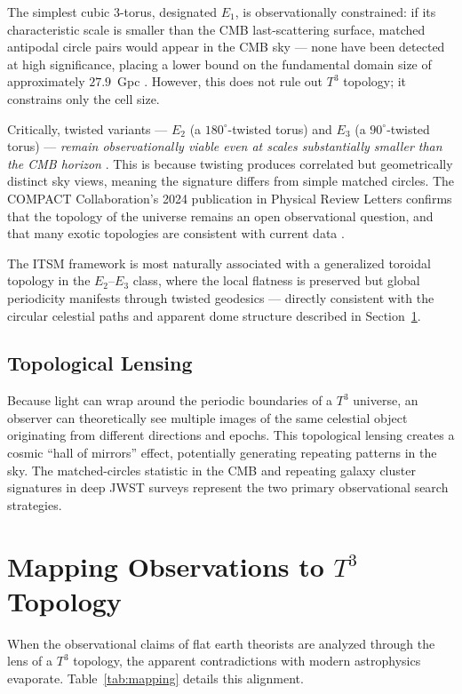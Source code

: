 \documentclass[aps,prd,11pt,onecolumn,superscriptaddress,nofootinbib,floatfix]{revtex4-2}
\begin{document}
The simplest cubic 3-torus, designated $E_1$, is observationally constrained: if its characteristic scale is smaller than the CMB last-scattering surface, matched antipodal circle pairs would appear in the CMB sky --- none have been detected at high significance, placing a lower bound on the fundamental domain size of approximately $27.9$~Gpc \cite{compact_pt1}. However, this does not rule out $T^3$ topology; it constrains only the cell size.

Critically, twisted variants --- $E_2$ (a $180^{\circ}$-twisted torus) and $E_3$ (a $90^{\circ}$-twisted torus) --- \emph{remain observationally viable even at scales substantially smaller than the CMB horizon} \cite{compact_promise}. This is because twisting produces correlated but geometrically distinct sky views, meaning the signature differs from simple matched circles. The COMPACT Collaboration's 2024 publication in Physical Review Letters confirms that the topology of the universe remains an open observational question, and that many exotic topologies are consistent with current data \cite{compact_promise}.

The ITSM framework is most naturally associated with a generalized toroidal topology in the $E_2$--$E_3$ class, where the local flatness is preserved but global periodicity manifests through twisted geodesics --- directly consistent with the circular celestial paths and apparent dome structure described in Section~\ref{sec:mapping}.

\subsection{Topological Lensing}
Because light can wrap around the periodic boundaries of a $T^3$ universe, an observer can theoretically see multiple images of the same celestial object originating from different directions and epochs. This topological lensing creates a cosmic ``hall of mirrors'' effect, potentially generating repeating patterns in the sky. The matched-circles statistic in the CMB \cite{compact_pt1} and repeating galaxy cluster signatures in deep JWST surveys represent the two primary observational search strategies.

\section{Mapping Observations to $T^3$ Topology}
\label{sec:mapping}

When the observational claims of flat earth theorists are analyzed through the lens of a $T^3$ topology, the apparent contradictions with modern astrophysics evaporate. Table~\ref{tab:mapping} details this alignment.
\end{document}
